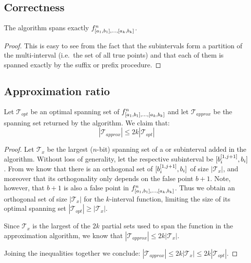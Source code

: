 
\subsection{Correctness}
\begin{theorem}
The algorithm spans exactly
$f^n_{[a_1, b_1], \ldots, [a_k, b_k]}$.
\end{theorem}

\begin{proof}
This is easy to see from the fact that the subintervals
form a partition of the multi-interval
(i.e.~the set of all true points)
and that each of them is spanned exactly
by the suffix or prefix procedure.
\end{proof}

\subsection{Approximation ratio}
\begin{theorem}
\label{theorem:2kapproxratio}
Let $\mathcal{T}_{opt}$ be an optimal spanning set of
$f^n_{[a_1, b_1], \ldots, [a_k, b_k]}$
and let $\mathcal{T}_{approx}$ be the spanning set returned
by the algorithm.
We claim that:
\begin{equation}
|\mathcal{T}_{approx}| \leq 2k |\mathcal{T}_{opt}|
\end{equation}
\end{theorem}

\begin{proof}
Let $\mathcal{T}_x$ be the largest ($n$-bit) spanning set
of a  or  subinterval
added in the algorithm.
Without loss of generality,
let the respective subinterval be 
$[b_i^{[1, j+1]}, b_i]$.
From \cite[p.~36]{Dubovsky2012} we know that
there is an orthogonal set
of $[b_i^{[1, j+1]}, b_i]$
of size $|\mathcal{T}_x|$,
and moreover that its orthogonality only depends
on the false point $b+1$.
Note, however, that $b+1$ is also a false point in
$f^n_{[a_1, b_1], \ldots, [a_k, b_k]}$.
Thus we obtain an orthogonal set of size $|\mathcal{T}_x|$
for the $k$-interval function,
limiting the size of its optimal spanning set
$|\mathcal{T}_{opt}| \geq |\mathcal{T}_x|$.

Since $\mathcal{T}_x$ is the largest
of the $2k$ partial sets used to span the function
in the approximation algorithm,
we know that
$|\mathcal{T}_{approx}| \leq 2k |\mathcal{T}_x|$.

Joining the inequalities together we conclude:
$|\mathcal{T}_{approx}| \leq 2k |\mathcal{T}_x| \leq
2k |\mathcal{T}_{opt}|$.
\end{proof}

